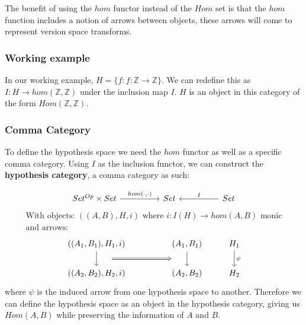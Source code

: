 \documentclass{article}
\theoremstyle{definition}
\begin{document}
The benefit of using the $hom$ functor instead of the $Hom$ set is that the $hom$ function includes a notion of arrows between objects, these arrows will come to represent version space transforms.

\subsubsection{Working example}
In our working example, $H=\{f: f: \mathbb{Z} \rightarrow \mathbb{Z}\}$. We can redefine this as $I: H\rightarrow hom(\mathbb{Z},\mathbb{Z})$ under the inclusion map $I$. $H$ is an object in this category of the form $Hom(\mathbb{Z},\mathbb{Z})$.

\subsubsection{Comma Category}
To define the hypothesis space we need the $hom$ functor as well as a specific comma category. Using $I$ as the inclusion functor, we can construct the \textbf{hypothesis category}, a comma category as such: 

\[\begin{tikzcd}
	{Set^{Op} \times Set} && Set && Set
	\arrow["{hom(\cdot, \cdot)}", from=1-1, to=1-3]
	\arrow["I"', from=1-5, to=1-3]
\end{tikzcd}\]
\begin{gather*}
    \text{With objects: } ((A,B), H, i) \text{ where $i: I(H) \rightarrow hom(A,B)$ monic} \\
    \text{and arrows: } 
\end{gather*}
\[\begin{tikzcd}
	{((A_1,B_1), H_1, i)} && {(A_1, B_1)} & {H_1} \\
	{((A_2,B_2),H_2, i)} && {(A_2,B_2)} & {H_2}
	\arrow[""{name=0, anchor=center, inner sep=0}, from=1-1, to=2-1]
	\arrow[""{name=1, anchor=center, inner sep=0}, from=1-3, to=2-3]
	\arrow["\psi", from=1-4, to=2-4]
	\arrow[shorten <=18pt, shorten >=18pt, Rightarrow, from=0, to=1]
\end{tikzcd}\]
where $\psi$ is the induced arrow from one hypothesis space to another. Therefore we can define the hypothesis space as an object in the hypothesis category, giving us $Hom(A,B)$ while preserving the information of $A$ and $B$.
\end{document}
